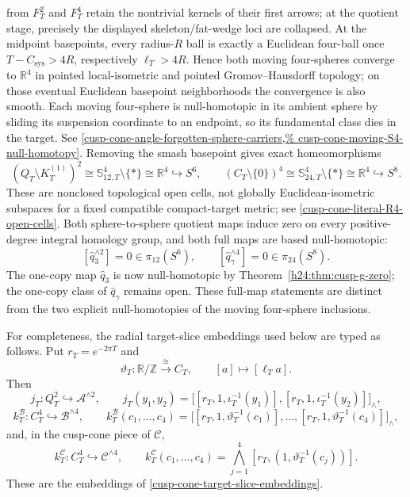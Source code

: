 \begin{enumerate}[leftmargin=1.8em,itemsep=.65em]
from \(F_T^2\) and \(F_T^4\) retain the nontrivial kernels of their first
arrows; at the quotient stage, precisely the displayed skeleton/fat-wedge
loci are collapsed.  At the
midpoint basepoints, every radius-\(R\) ball is exactly a Euclidean four-ball
once \(T-C_{\mathrm{sys}}>4R\), respectively \(\ell_T>4R\).  Hence both
moving four-spheres converge to \(\mathbb R^4\) in pointed local-isometric and
pointed Gromov--Hausdorff topology; on those eventual Euclidean basepoint
neighborhoods the convergence is also smooth.  Each moving four-sphere is
null-homotopic in its ambient sphere by sliding its suspension coordinate to
an endpoint, so its fundamental class dies in the target.  See
\cref{cusp-cone-angle-forgotten-sphere-carriers,%
cusp-cone-moving-S4-null-homotopy}.
Removing the smash basepoint gives exact homeomorphisms
\[
 (Q_T\setminus K_T^{(1)})^2
 \cong\mathbb S_{12,T}^4\setminus\{*\}
 \cong\mathbb R^4\hookrightarrow S^6,
\qquad
 (C_T\setminus\{0\})^4
 \cong\mathbb S_{24,T}^4\setminus\{*\}
 \cong\mathbb R^4\hookrightarrow S^8.
\]
These are nonclosed topological open cells, not globally Euclidean-isometric
subspaces for a fixed compatible compact-target metric; see
\cref{cusp-cone-literal-R4-open-cells}.
Both sphere-to-sphere quotient maps induce zero on every positive-degree
integral homology group, and both full maps are based null-homotopic:
\[
 [\widehat q_3^{\wedge2}]=0\in\pi_{12}(S^6),
 \qquad
 [\widehat q_\gamma^{\wedge4}]=0\in\pi_{24}(S^8).
\]
The one-copy map $\widehat q_3$ is now null-homotopic by
Theorem~\ref{h24:thm:cusp-g-zero}; the one-copy class of
$\widehat q_\gamma$ remains open. These full-map statements are
distinct from the two explicit null-homotopies of the moving four-sphere
inclusions.

For completeness, the radial target-slice embeddings used below are typed as
follows.  Put \(r_T=e^{-2\pi T}\) and
\[
 \vartheta_T:\mathbb R/\mathbb Z\xrightarrow{\ \cong\ }C_T,
 \qquad[a]\longmapsto[\ell_Ta].
\]
Then
\[
 j_T:Q_T^2\hookrightarrow\mathcal A^{\wedge2},\qquad
 j_T(y_1,y_2)=
 \bigl[[r_T,1,\iota_T^{-1}(y_1)],
       [r_T,1,\iota_T^{-1}(y_2)]\bigr]_{\wedge},
\]
\[
 k_T^{\mathcal B}:C_T^4\hookrightarrow\mathcal B^{\wedge4},\qquad
 k_T^{\mathcal B}(c_1,\ldots,c_4)=
 \bigl[[r_T,1,\vartheta_T^{-1}(c_1)],\ldots,
       [r_T,1,\vartheta_T^{-1}(c_4)]\bigr]_{\wedge},
\]
and, in the cusp-cone piece of \(\mathcal C\),
\[
 k_T^{\mathcal C}:C_T^4\hookrightarrow\mathcal C^{\wedge4},\qquad
 k_T^{\mathcal C}(c_1,\ldots,c_4)=
 \bigwedge_{j=1}^4[r_T,(1,\vartheta_T^{-1}(c_j))].
\]
These are the embeddings of
\cref{cusp-cone-target-slice-embeddings}.


\end{enumerate}
